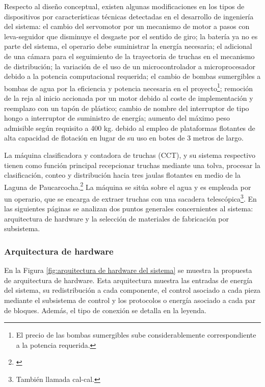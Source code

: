 Respecto al diseño conceptual, existen algunas modificaciones en los tipos de dispositivos por características técnicas detectadas en el desarrollo de ingeniería del sistema: el cambio del servomotor por un mecanismo de motor a pasos con leva-seguidor que disminuye el desgaste por el sentido de giro; la batería ya no es parte del sistema, el operario debe suministrar la energía necesaria; el adicional de una cámara para el seguimiento de la trayectoria de truchas en el mecanismo de distribución; la variación de el uso de un microcontrolador a microprocesador debido a la potencia computacional requerida; el cambio de bombas sumergibles a bombas de agua por la eficiencia y potencia necesaria en el proyecto\footnote{El precio de las bombas sumergibles sube considerablemente correspondiente a la potencia requerida.}; remoción de la reja al inicio accionada por un motor debido al coste de implementación y reemplazo con un tapón de plástico; cambio de nombre del interruptor de tipo hongo a interruptor de suministro de energía; aumento del máximo peso admisible según requisito a 400 kg. debido al empleo de plataformas flotantes de alta capacidad de flotación en lugar de su uso en botes de 3 metros de largo.



La máquina clasificadora y contadora de truchas (CCT), y su sistema respectivo tienen como función principal recepcionar truchas mediante una tolva, procesar la clasificación, conteo y distribución hacia tres jaulas flotantes en medio de la Laguna de Paucarcocha.\footnote{\cite{DiazVergara2020}} La máquina se sitúa sobre el agua y es empleada por un operario, que se encarga de extraer truchas con una sacadera telescópica\footnote{También llamada cal-cal.}. En las siguientes páginas se analizan dos puntos generales concernientes al sistema: arquitectura de hardware y la selección de materiales de fabricación por subsistema.

\subsubsection{Arquitectura de hardware}

En la Figura \ref{fig:arquitectura de hardware del sistema} se muestra la propuesta de arquitectura de hardware. Esta arquitectura muestra las entradas de energía del sistema, su redistribución a cada componente, el control asociado a cada pieza mediante el subsistema de control y los protocolos o energía asociado a cada par de bloques. Además, el tipo de conexión se detalla en la leyenda. 

